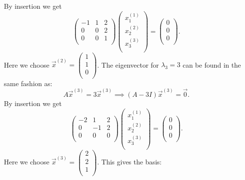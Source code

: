 By insertion we get
\[ 
\begin{pmatrix}
-1 & 1 & 2\\
0 & 0 & 2\\
0 & 0 & 1\\
\end{pmatrix} \begin{pmatrix}
x_1^{(1)}\\
x_2^{(2)}\\
x_3^{(3)}\\
\end{pmatrix} = \begin{pmatrix}
0\\
0\\
0\\
\end{pmatrix}
.\]
Here we choose $\Vec{x}^{(2)} = \begin{pmatrix}
1\\
1\\
0\\
\end{pmatrix}$. The eigenvector for $\lambda_3 = 3$ can be found in the same fashion as:
\[ 
A \Vec{x}^{(3)} = 3 \Vec{x}^{(3)} \implies (A - 3I) \Vec{x}^{(3)} = \Vec{0}
.\]
By insertion we get
\[ 
\begin{pmatrix}
-2 & 1 & 2\\
0 & -1 & 2\\
0 & 0 & 0\\
\end{pmatrix} \begin{pmatrix}
x_1^{(1)}\\
x_2^{(2)}\\
x_3^{(3)}\\
\end{pmatrix} = \begin{pmatrix}
0\\
0\\
0\\
\end{pmatrix}
.\]
Here we choose $\Vec{x}^{(3)} = \begin{pmatrix}
2\\
2\\
1\\
\end{pmatrix}$. This gives the basis:
